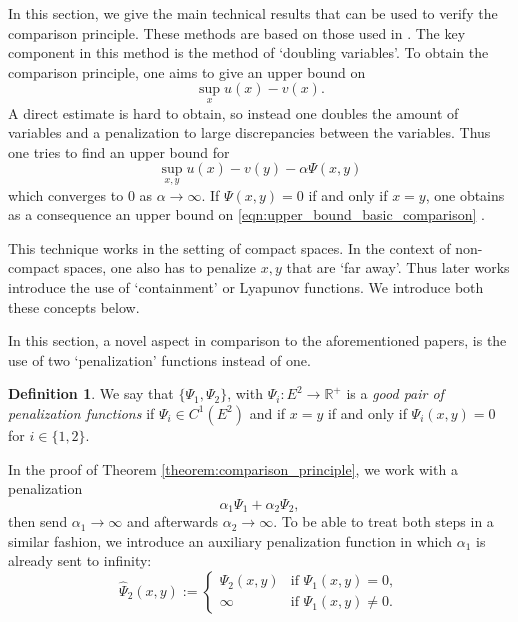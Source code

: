 \documentclass[a4paper]{article}
\newcommand{\bR}{\mathbb{R}}
\numberwithin{equation}{section}
\theoremstyle{definition}
\newtheorem{definition}[theorem]{Definition}
\begin{document}
\smallskip

In this section, we give the main technical results that can be used to verify the comparison principle. These methods are based on those used in \cite{CIL92,FK06,DFL11,Kr16b,CoKr17}. The key component in this method is the method of `doubling variables'. To obtain the comparison principle, one aims to give an upper bound on
\begin{equation} \label{eqn:upper_bound_basic_comparison}
	\sup_x u(x) - v(x).
\end{equation}
A direct estimate is hard to obtain, so instead one doubles the amount of variables and a penalization to large discrepancies between the variables. Thus one tries to find an upper bound for
\begin{equation*}
	\sup_{x,y} u(x) - v(y) - \alpha \Psi(x,y)
\end{equation*}
which converges to $0$ as $\alpha \rightarrow \infty$. If $\Psi(x,y) = 0$ if and only if $x = y$, one obtains as a consequence an upper bound on \eqref{eqn:upper_bound_basic_comparison} .

This technique works in the setting of compact spaces. In the context of non-compact spaces, one also has to penalize $x,y$ that are `far away'. Thus later works introduce the use of `containment' or Lyapunov functions. We introduce both these concepts below.

In this section, a novel aspect in comparison to the aforementioned papers, is the use of two `penalization' functions instead of one. 


\begin{definition}
	We say that $\{\Psi_1,\Psi_2\}$, with $\Psi_i : E^2 \rightarrow \bR^+$ is a \textit{good pair of penalization functions} if $\Psi_i \in C^1(E^2)$ and if $x = y$ if and only if $\Psi_i(x,y) = 0$ for $i \in \{1,2\}$.
\end{definition}

In the proof of Theorem \ref{theorem:comparison_principle}, we work with a penalization
\begin{equation*}
	\alpha_1 \Psi_1 + \alpha_2 \Psi_2,
\end{equation*}
then send $\alpha_1 \rightarrow \infty$ and afterwards $\alpha_2 \rightarrow \infty$. To be able to treat both steps in a similar fashion, we introduce an auxiliary penalization function in which $\alpha_1$ is already sent to infinity:
\begin{equation*}
	\widehat{\Psi}_2(x,y)  
	:= \begin{cases}
		\Psi_2(x,y) & \text{if } \Psi_1(x,y) = 0, \\
		\infty & \text{if }  \Psi_1(x,y) \neq 0.
	\end{cases}
\end{equation*}
\end{document}
